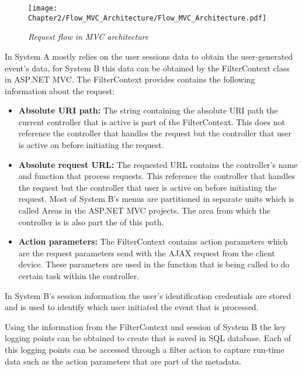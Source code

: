 \begin{figure}[!htb] %
	\centering %
	\texttt{[image: Chapter2/Flow\_MVC\_Architecture/Flow\_MVC\_Architecture.pdf]}
	\caption[Request flow in MVC architecture]
	{\textit{Request flow in MVC architecture \cite{Gu2010}}}\label{fig:ch2_Flow_MVC_Architecture}
\end{figure}

In  System A mostly relies on the user sessions data to obtain the user-generated event's data, for System B this data can be obtained by the FilterContext class in ASP.NET MVC. The FilterContext provides contains the following information about the request:

\begin{itemize}
	\item \textbf{Absolute URI path:} The string containing the absolute URI path the current controller that is active is part of the FilterContext. This does not reference the controller that handles the request but the controller that user is active on before initiating the request. 
	\item \textbf{Absolute request URL:} The requested URL contains the controller's name and function that process requests. This reference the controller that handles the request but the controller that user is active on before initiating the request. Most of System B's menus are partitioned in separate units which is called Areas in the ASP.NET MVC projects. The area from which the controller is is also part the of this path.
	\item \textbf{Action parameters:} The FilterContext contains action parameters which are the request parameters send with the AJAX request from the client device. These parameters are used in the function that is being called to do certain task within the controller.
\end{itemize}

In System B's session information the user's identification credentials are stored and is used to identify which user initiated the event that is processed.

\clearpage

Using the information from the FilterContext and session of System B the key logging points can be obtained to create  that is saved in SQL database. Each of this logging points can be accessed through a filter action to capture run-time data such as the action parameters that are part of the metadata.

